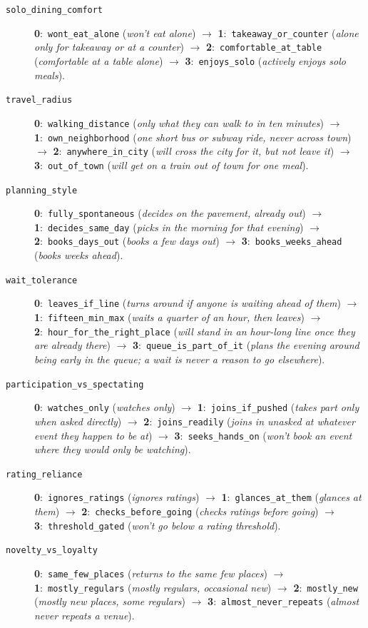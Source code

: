 \documentclass{article}
\begin{document}
\begin{description}
  \item[\texttt{solo\_dining\_comfort}] \textbf{0}:~\texttt{wont\_eat\_alone} (\emph{won't eat alone}) $\to$ \textbf{1}:~\texttt{takeaway\_or\_counter} (\emph{alone only for takeaway or at a counter}) $\to$ \textbf{2}:~\texttt{comfortable\_at\_table} (\emph{comfortable at a table alone}) $\to$ \textbf{3}:~\texttt{enjoys\_solo} (\emph{actively enjoys solo meals}).
  \item[\texttt{travel\_radius}] \textbf{0}:~\texttt{walking\_distance} (\emph{only what they can walk to in ten minutes}) $\to$ \textbf{1}:~\texttt{own\_neighborhood} (\emph{one short bus or subway ride, never across town}) $\to$ \textbf{2}:~\texttt{anywhere\_in\_city} (\emph{will cross the city for it, but not leave it}) $\to$ \textbf{3}:~\texttt{out\_of\_town} (\emph{will get on a train out of town for one meal}).
  \item[\texttt{planning\_style}] \textbf{0}:~\texttt{fully\_spontaneous} (\emph{decides on the pavement, already out}) $\to$ \textbf{1}:~\texttt{decides\_same\_day} (\emph{picks in the morning for that evening}) $\to$ \textbf{2}:~\texttt{books\_days\_out} (\emph{books a few days out}) $\to$ \textbf{3}:~\texttt{books\_weeks\_ahead} (\emph{books weeks ahead}).
  \item[\texttt{wait\_tolerance}] \textbf{0}:~\texttt{leaves\_if\_line} (\emph{turns around if anyone is waiting ahead of them}) $\to$ \textbf{1}:~\texttt{fifteen\_min\_max} (\emph{waits a quarter of an hour, then leaves}) $\to$ \textbf{2}:~\texttt{hour\_for\_the\_right\_place} (\emph{will stand in an hour-long line once they are already there}) $\to$ \textbf{3}:~\texttt{queue\_is\_part\_of\_it} (\emph{plans the evening around being early in the queue; a wait is never a reason to go elsewhere}).
  \item[\texttt{participation\_vs\_spectating}] \textbf{0}:~\texttt{watches\_only} (\emph{watches only}) $\to$ \textbf{1}:~\texttt{joins\_if\_pushed} (\emph{takes part only when asked directly}) $\to$ \textbf{2}:~\texttt{joins\_readily} (\emph{joins in unasked at whatever event they happen to be at}) $\to$ \textbf{3}:~\texttt{seeks\_hands\_on} (\emph{won't book an event where they would only be watching}).
  \item[\texttt{rating\_reliance}] \textbf{0}:~\texttt{ignores\_ratings} (\emph{ignores ratings}) $\to$ \textbf{1}:~\texttt{glances\_at\_them} (\emph{glances at them}) $\to$ \textbf{2}:~\texttt{checks\_before\_going} (\emph{checks ratings before going}) $\to$ \textbf{3}:~\texttt{threshold\_gated} (\emph{won't go below a rating threshold}).
  \item[\texttt{novelty\_vs\_loyalty}] \textbf{0}:~\texttt{same\_few\_places} (\emph{returns to the same few places}) $\to$ \textbf{1}:~\texttt{mostly\_regulars} (\emph{mostly regulars, occasional new}) $\to$ \textbf{2}:~\texttt{mostly\_new} (\emph{mostly new places, some regulars}) $\to$ \textbf{3}:~\texttt{almost\_never\_repeats} (\emph{almost never repeats a venue}).
\end{description}
\end{document}
